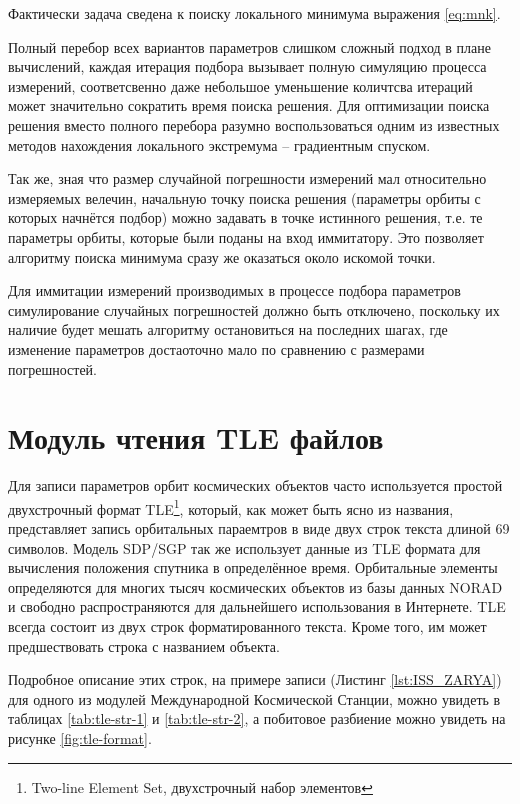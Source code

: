 Фактически задача сведена к поиску локального минимума выражения \ref{eq:mnk}.

Полный перебор всех вариантов параметров слишком сложный подход в плане вычислений, каждая итерация
подбора вызывает полную симуляцию процесса измерений, соответсвенно даже небольшое уменьшение количтсва итераций
может значительно сократить время поиска решения. Для оптимизации поиска решения вместо полного 
перебора разумно воспользоваться одним из известных методов нахождения локального 
экстремума -- градиентным спуском. 

Так же, зная что размер случайной погрешности измерений мал относительно 
измеряемых велечин, начальную точку поиска решения (параметры орбиты с которых начнётся подбор) 
можно задавать в точке истинного решения, т.е. те параметры орбиты, которые были поданы на вход иммитатору. 
Это позволяет алгоритму поиска минимума сразу же оказаться около искомой точки.

Для иммитации измерений производимых в процессе подбора параметров симулирование случайных погрешностей должно быть
отключено, поскольку их наличие будет мешать алгоритму остановиться на последних шагах, где изменение параметров 
достаоточно мало по сравнению с размерами погрешностей.

\section{Модуль чтения TLE файлов} \label{sbs:tle-module}

Для записи параметров орбит космических объектов часто используется простой двухстрочный формат 
TLE\footnote{Two-line Element Set, двухстрочный набор элементов}, который, как может быть ясно из названия, 
представляет запись орбитальных параемтров в виде двух строк текста длиной 69 символов. Модель SDP/SGP\cite{Norad}
так же использует данные из TLE формата для вычисления положения спутника в определённое время. Орбитальные элементы
определяются для многих тысяч космических объектов из базы данных NORAD и свободно распространяются для дальнейшего
использования в Интернете. TLE всегда состоит из двух строк форматированного текста. Кроме того, им может
предшествовать строка с названием объекта.

Подробное описание этих строк, на примере записи (Листинг \ref{lst:ISS_ZARYA}) для одного из модулей Международной
Космической Станции, можно увидеть в таблицах \ref{tab:tle-str-1} и \ref{tab:tle-str-2}, а побитовое разбиение
можно увидеть на рисунке \ref{fig:tle-format}.

